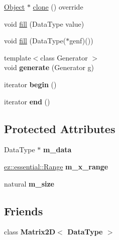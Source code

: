 \begin{DoxyCompactItemize}
\item 
\hyperlink{classez_1_1objects_1_1Object}{Object} $\ast$ \hyperlink{classez_1_1objects_1_1Array_a8618e73b6309573691b1fea690b8213a}{clone} () override
\item 
void \hyperlink{classez_1_1objects_1_1Array_a5ba81305951bfdef7454b3d3f11fc9d9}{fill} (Data\+Type value)
\item 
void \hyperlink{classez_1_1objects_1_1Array_aebeb0faa252f89e996f0b3a7250fa20b}{fill} (Data\+Type($\ast$genf)())
\item 
\mbox{\label{classez_1_1objects_1_1Array_a935d5465ebb01aa797d16221cbd7a1ad}} 
{\footnotesize template$<$class Generator $>$ }\\void {\bfseries generate} (Generator g)
\item 
\mbox{\label{classez_1_1objects_1_1Array_a13efb7e2473aebcb151b35245351644d}} 
iterator {\bfseries begin} ()
\item 
\mbox{\label{classez_1_1objects_1_1Array_a66963da28335730f557d63b7b4793c7d}} 
iterator {\bfseries end} ()
\end{DoxyCompactItemize}
\subsection*{Protected Attributes}
\begin{DoxyCompactItemize}
\item 
\mbox{\label{classez_1_1objects_1_1Array_a407695d81a0d4b0109d1238ff448fdbc}} 
Data\+Type $\ast$ {\bfseries m\+\_\+data}
\item 
\mbox{\label{classez_1_1objects_1_1Array_ad847a900350b845d2aee2325cb6c5441}} 
\hyperlink{classez_1_1essential_1_1Range}{ez\+::essential\+::\+Range} {\bfseries m\+\_\+x\+\_\+range}
\item 
\mbox{\label{classez_1_1objects_1_1Array_a53f49eb0bd13bf6aef934319cf4f11b8}} 
natural {\bfseries m\+\_\+size}
\end{DoxyCompactItemize}
\subsection*{Friends}
\begin{DoxyCompactItemize}
\item 
\mbox{\label{classez_1_1objects_1_1Array_aeada2177993d302d67110286099e5ccc}} 
class {\bfseries Matrix2\+D$<$ Data\+Type $>$}
\end{DoxyCompactItemize}
